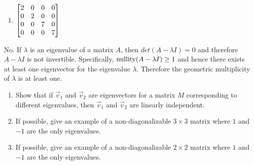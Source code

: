 \begin{exercises}
\begin{problist}
		\begin{solution}

			\begin{enumerate}
				\item $\mat{2&0&0&0\\0&2&0&0\\0&0&7&0\\0&0&0&7}$
			\end{enumerate}
		\end{solution}%

		\begin{solution}
			No. If $\lambda$ is an eigenvalue of a matrix $A$, then $det(A -
			\lambda I)=0$ and therefore $A - \lambda I$ is not invertible. Specifically,
			$\operatorname{nullity}(A - \lambda I) \geq 1$ and hence there exists at least one
			eigenvector for the eigenvalue $\lambda$. Therefore the geometric
			multiplicity of $\lambda$ is at least one.
		\end{solution}\prob
		\begin{enumerate}
			\item Show that if $\vec v_{1}$ and $\vec v_{2}$ are eigenvectors for
				a matrix $M$ corresponding to different eigenvalues, then $\vec
				v_{1}$ and $\vec v_{2}$ are linearly independent.

			\item If possible, give an example of a non-diagonalizable $3\times
				3$ matrix where $1$ and $-1$ are the only eigenvalues.

			\item If possible, give an example of a non-diagonalizable $2\times
				2$ matrix where $1$ and $-1$ are the only eigenvalues.
		\end{enumerate}
	\end{problist}
\end{exercises}